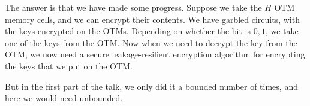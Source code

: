 \documentclass[10pt]{article}
\begin{document}
The answer is that we have made some progress. Suppose we take the $H$ OTM memory cells, and we can encrypt their contents. We have garbled circuits, with the keys encrypted on the OTMs. Depending on whether the bit is $0, 1$, we take one of the keys from the OTM. Now when we need to decrypt the key from the OTM, we now need a secure leakage-resilient encryption algorithm for encrypting the keys that we put on the OTM.

But in the first part of the talk, we only did it a bounded number of times, and here we would need unbounded.


\nocite{*}


\end{document}
